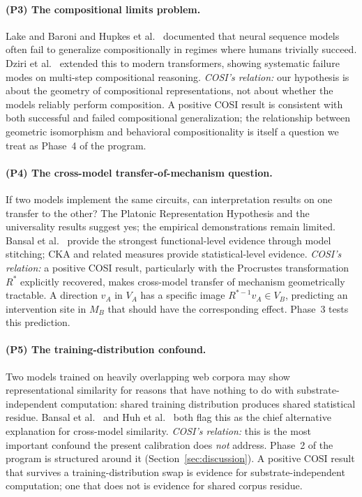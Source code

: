 \paragraph{(P3) The compositional limits problem.}
Lake and Baroni \cite{lake2018generalization} and Hupkes et
al.~\cite{hupkes2020compositionality} documented that neural sequence
models often fail to generalize compositionally in regimes where humans
trivially succeed. Dziri et al.~\cite{dziri2024faith} extended this to
modern transformers, showing systematic failure modes on multi-step
compositional reasoning. \emph{COSI's relation:} our hypothesis is
about the geometry of compositional representations, not about whether
the models reliably perform composition. A positive COSI result is
consistent with both successful and failed compositional generalization;
the relationship between geometric isomorphism and behavioral
compositionality is itself a question we treat as Phase~4 of the
program.

\paragraph{(P4) The cross-model transfer-of-mechanism question.}
If two models implement the same circuits, can interpretation results
on one transfer to the other? The Platonic Representation Hypothesis
\cite{huh2024platonic} and the universality results
\cite{olah2020zoom, chughtai2023toy, gurnee2024universal} suggest yes;
the empirical demonstrations remain limited. Bansal et
al.~\cite{bansal2021revisiting} provide the strongest functional-level
evidence through model stitching; CKA \cite{kornblith2019similarity}
and related measures provide statistical-level evidence. \emph{COSI's
relation:} a positive COSI result, particularly with the Procrustes
transformation $R^*$ explicitly recovered, makes cross-model transfer
of mechanism geometrically tractable. A direction $v_A$ in $V_A$ has a
specific image $R^{*-1} v_A \in V_B$, predicting an intervention site
in $M_B$ that should have the corresponding effect. Phase~3 tests this
prediction.

\paragraph{(P5) The training-distribution confound.}
Two models trained on heavily overlapping web corpora may show
representational similarity for reasons that have nothing to do with
substrate-independent computation: shared training distribution
produces shared statistical residue. Bansal et
al.~\cite{bansal2021revisiting} and Huh et al.~\cite{huh2024platonic}
both flag this as the chief alternative explanation for cross-model
similarity. \emph{COSI's relation:} this is the most important
confound the present calibration does \emph{not} address. Phase~2 of
the program is structured around it (Section~\ref{sec:discussion}).
A positive COSI result that survives a training-distribution swap is
evidence for substrate-independent computation; one that does not is
evidence for shared corpus residue.

